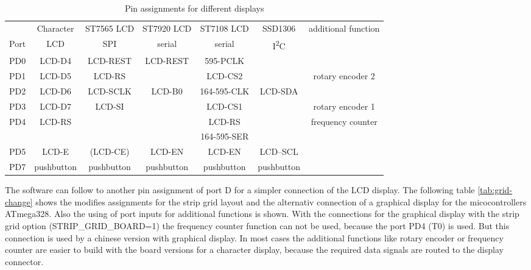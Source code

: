 \begin{table}[H]
  \begin{center}
    \begin{tabular}{| c || c | c | c | c | c | c |}
    \hline
           & Character     & ST7565 LCD & ST7920 LCD     & ST7108 LCD  & SSD1306     & additional function \\
      Port & LCD           &   SPI      & serial         & serial      &   I\textsuperscript{2}C      & \\
    \hline
    \hline
    PD0    &  LCD-D4       &  LCD-REST  & LCD-REST       & 595-PCLK        &            & \\
    \hline
    PD1    &  LCD-D5       &  LCD-RS    &                & LCD-CS2     &             & rotary encoder 2 \\
    \hline
    PD2    &  LCD-D6       &  LCD-SCLK  & LCD-B0         & 164-595-CLK &  LCD-SDA    & \\
    \hline
    PD3    &  LCD-D7       &  LCD-SI    &                & LCD-CS1     &             & rotary encoder 1 \\
    \hline
    PD4    &  LCD-RS       &            &                & LCD-RS      &             & frequency counter \\
           &               &            &                & 164-595-SER &             &                \\
    \hline
    PD5    &  LCD-E        & (LCD-CE)   & LCD-EN         & LCD-EN      &   LCD--SCL  & \\
    \hline
    PD7    &  pushbutton   & pushbutton & pushbutton     & pushbutton  & pushbutton  & \\
    \hline
    \end{tabular}
  \end{center}
  \caption{Pin assignments for different displays}
  \label{tab:display-con}
\end{table}


The software can follow to another pin assignment of port D for a simpler connection of the
LCD display. 
The following table \ref{tab:grid-change} shows the modifies assignments for the strip grid layout and
the alternativ connection of a graphical display for the micocontrollers ATmega328.
Also the using of port inputs for additional functions is shown.
With the connections for the graphical display with the strip grid option (STRIP\_GRID\_BOARD=1)
the frequency counter function can not be used, because the port PD4 (T0) is used.
But this connection is used by a chinese version with graphical display. 
In most cases the additional functions like rotary encoder or frequency counter are easier to
build with the board versions for a character display, because the required data signals are
routed to the display connector.



